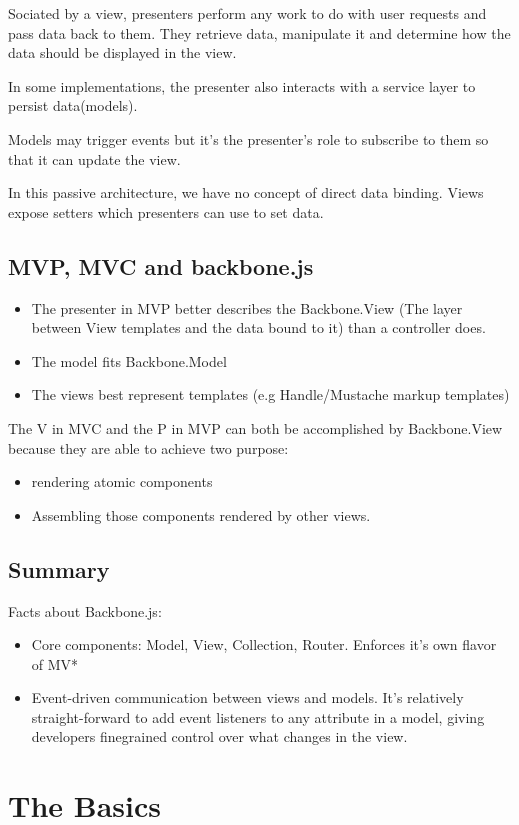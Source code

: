 \documentclass[a4paper, 11pt]{book}
\begin{document}
Sociated by a view, presenters perform any work to do with user requests and
pass data  back to them. They retrieve data, manipulate it and determine how the
data should be displayed in the view.

In some implementations, the presenter also interacts with a service layer to
persist data(models).

Models may trigger events but it's the presenter's role to subscribe to them so
that it can update the view. 

In this passive architecture, we have no concept of direct data binding. Views
expose setters which presenters can use to set data.

\section{MVP, MVC and backbone.js}
\begin{itemize}
\item The presenter in MVP better describes the Backbone.View (The layer between
View templates and the data bound to it) than a controller does.
\item The model fits Backbone.Model
\item The views best represent templates (e.g Handle/Mustache markup templates) 
\end{itemize}
The V in MVC and the P in MVP can both be accomplished by Backbone.View because
they are able to achieve two purpose:
\begin{itemize}
\item rendering atomic components
\item Assembling those components rendered by other views.
\end{itemize}

\section{Summary}
Facts about Backbone.js:
\begin{itemize}
\item Core components: Model, View, Collection, Router. Enforces it's own flavor
of MV*
\item Event-driven communication between views and models. It's relatively
straight-forward to add event listeners to any attribute in a model, giving
developers finegrained control over what changes in the view.
\end{itemize}
\chapter{The Basics}
\end{document}
